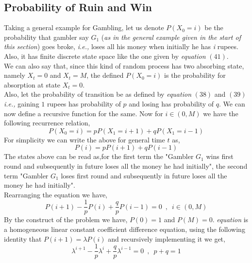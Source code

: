 \documentclass[12pt,a4paper]{article}%
\begin{document}
\begin{flushleft}
 		\subsection{Probability of Ruin and Win}
 		Taking a general example for Gambling, let us denote $P(X_{0}=i)$ be the probability that gambler say $G_1$ (\textit{as in the general example given in the start of this section}) goes broke, \textit{i.e.,} loses all his money when initially he has \textit{i} rupees. Also, it has finite discrete state space like the one given by \textit{equation} $(41)$. \\\smallskip
 		We can also say that, since this kind of random process has two absorbing state, namely $X_{t}=0$ and $X_{t}=M$, the defined $P(X_{0}=i)$ is the probability for absorption at state $X_{t}=0$.\\\smallskip
 		Also, let the probability of transition be as defined by \textit{equation} $(38)$ and $(39)$ \textit{i.e.,} gaining $1$ rupees has probability of $p$ and losing has probability of $q$. We can now define a recursive function for the same. Now for $i \in (0,M)$ we have the following recurrence relation,\\\smallskip
 		\begin{equation}
 			P(X_{0}=i)=pP(X_{1}=i+1)+qP(X_{1}=i-1)
 		\end{equation}
 		For simplicity we can write the above for general time $t$ as,
 		\begin{equation}
 			P(i)=pP(i+1)+qP(i-1)
 		\end{equation}
 		The states above can be read as,for the first term the "Gambler $G_1$ wins first round and subsequently in future loses all the money he had initially", the second term "Gambler $G_1$ loses first round and subsequently in future loses all the money he had initially".\\\smallskip
 		Rearranging the equation we have,
 		\begin{equation}
 			P(i+1)-\dfrac{1}{p}P(i)+\dfrac{q}{p}P(i-1)=0\enspace,\enspace i \in (0,M)
 		\end{equation}
 		By the construct of the problem we have, $P(0)=1$ and $P(M)=0$. \textit{equation} is a homogeneous linear constant coefficient difference equation, using the following identity that $P(i+1)=\lambda P(i)$ and recursively implementing it we get,\\\smallskip
 		\begin{equation}
 		\lambda^{i+1}-\dfrac{1}{p}\lambda^{i}+\dfrac{q}{p}\lambda^{i-1}=0\enspace,\enspace p+q=1
 		\end{equation}

\end{flushleft}
\end{document}
